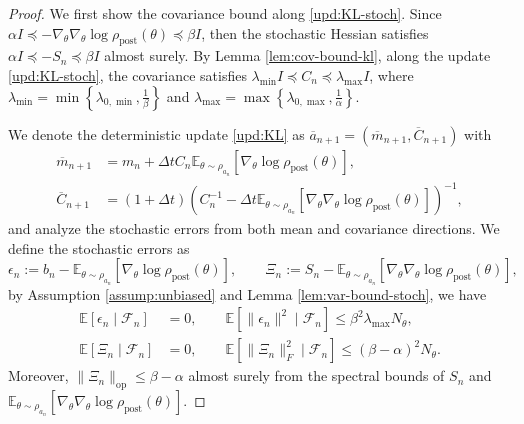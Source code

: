 \documentclass[11pt]{article}
\theoremstyle{plain}
\theoremstyle{definition}
\theoremstyle{remark}
\newcommand{\E}{\mathbb{E}}
\newcommand{\post}{\mathrm{post}}
\begin{document}
\begin{proof}
    We first show the covariance bound along \eqref{upd:KL-stoch}. Since $\alpha I \preceq -\nabla_\theta \nabla_\theta \log \rho_\mathrm{post} (\theta) \preceq \beta I$, then the stochastic Hessian satisfies $\alpha I \preceq -S_n \preceq \beta I$ almost surely. By Lemma \ref{lem:cov-bound-kl}, along the update \eqref{upd:KL-stoch}, the covariance satisfies $\lambda_{\min} I \preceq C_n \preceq \lambda_{\max} I$, where $\lambda_{\min} = \min \left\{ \lambda_{0, \min}, \frac{1}{\beta} \right\}$ and $\lambda_{\max} = \max \left\{ \lambda_{0, \max}, \frac{1}{\alpha} \right\}$.

    We denote the deterministic update \eqref{upd:KL} as $\overline{a}_{n+1} = (\overline{m}_{n+1}, \overline{C}_{n+1})$ with 
    \begin{align*}
        \overline{m}_{n+1} &= m_n + \Delta t C_n \mathbb{E}_{\theta \sim \rho_{a_n}} [\nabla_\theta \log \rho_\mathrm{post} (\theta)], \\
        \overline{C}_{n+1} &= (1 + \Delta t) (C_n^{-1} - \Delta t \mathbb{E}_{\theta \sim \rho_{a_n}} [\nabla_\theta \nabla_\theta \log \rho_\mathrm{post} (\theta)])^{-1},
    \end{align*}
    and analyze the stochastic errors from both mean and covariance directions. 
    We define the stochastic errors as 
    \begin{equation*}
        \epsilon_n := b_n - \E_{\theta \sim\rho_{a_n}} [\nabla_\theta \log \rho_\post (\theta)], \qquad \Xi_n := S_n - \E_{\theta \sim \rho_{a_n}} [\nabla_\theta \nabla_\theta \log \rho_\post (\theta)],
    \end{equation*}
    by Assumption \ref{assump:unbiased} and Lemma \ref{lem:var-bound-stoch}, we have
    \begin{align*}
        \E [\epsilon_n \mid \mathcal{F}_n] &= 0, \qquad \E[ \| \epsilon_n\|^2 \mid \mathcal{F}_n ] \leq \beta^2 \lambda_{\max} N_\theta, \\
        \E [\Xi_n \mid \mathcal{F}_n] &= 0, \qquad \E [\|\Xi_n\|_F^2 \mid \mathcal{F}_n] \leq (\beta - \alpha)^2 N_\theta.
    \end{align*}
    Moreover, $\| \Xi_n\|_\mathrm{op} \leq \beta - \alpha$ almost surely from the spectral bounds of $S_n$ and $\E_{\theta \sim \rho_{a_n}} [\nabla_\theta \nabla_\theta \log \rho_\post (\theta)]$.


\end{proof}
\end{document}
